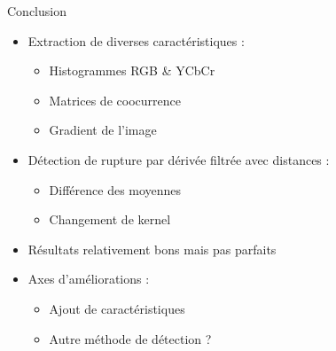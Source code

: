 \begin{frame}{Conclusion}

\begin{itemize}
\item Extraction de diverses caractéristiques :
\begin{itemize}
\item Histogrammes RGB \& YCbCr
\item Matrices de coocurrence
\item Gradient de l'image
\end{itemize}
\item Détection de rupture par dérivée filtrée avec distances :
\begin{itemize}
\item Différence des moyennes
\item Changement de kernel
\end{itemize}
\item Résultats relativement bons mais pas parfaits
\item Axes d'améliorations :
\begin{itemize}
\item Ajout de caractéristiques
\item Autre méthode de détection ?
\end{itemize}
\end{itemize}

\end{frame}
